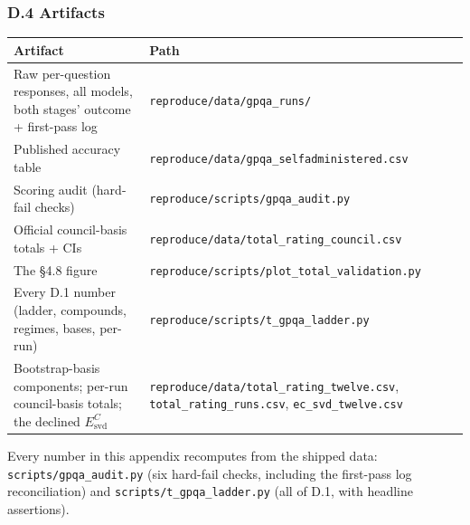 \subsubsection{D.4 Artifacts}\label{d.4-artifacts}

{\def\LTcaptype{none} %
\begin{longtable}[]{@{}
  >{\raggedright\arraybackslash}p{}
  >{\raggedright\arraybackslash}p{}@{}}
\toprule\noalign{}
\begin{minipage}[b]{\linewidth}\raggedright
Artifact
\end{minipage} & \begin{minipage}[b]{\linewidth}\raggedright
Path
\end{minipage} \\
\midrule\noalign{}
\endhead
\bottomrule\noalign{}
\endlastfoot
Raw per-question responses, all models, both stages' outcome + first-pass log & \texttt{reproduce/data/gpqa\_runs/} \\
Published accuracy table & \texttt{reproduce/data/gpqa\_selfadministered.csv} \\
Scoring audit (hard-fail checks) & \texttt{reproduce/scripts/gpqa\_audit.py} \\
Official council-basis totals + CIs & \texttt{reproduce/data/total\_rating\_council.csv} \\
The §4.8 figure & \texttt{reproduce/scripts/plot\_total\_validation.py} \\
Every D.1 number (ladder, compounds, regimes, bases, per-run) & \texttt{reproduce/scripts/t\_gpqa\_ladder.py} \\
Bootstrap-basis components; per-run council-basis totals; the declined \(E^{C}_{\text{svd}}\) & \texttt{reproduce/data/total\_rating\_twelve.csv}, \texttt{total\_rating\_runs.csv}, \texttt{ec\_svd\_twelve.csv} \\
\end{longtable}
}

Every number in this appendix recomputes from the shipped data: \texttt{scripts/gpqa\_audit.py} (six hard-fail checks, including the first-pass log reconciliation) and \texttt{scripts/t\_gpqa\_ladder.py} (all of D.1, with headline assertions).
